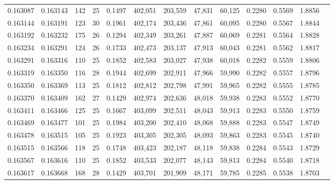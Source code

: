 \begin{tabular}{rrrrrrrrrrrrr}
0.163087 & 0.163143 & 142 &  25 &                                     0.1497 & 402,051 & 203,559 &  47,831 &  60,125 & 0.2280 & 0.5569 & 1.8856 \\
0.163144 & 0.163191 & 123 &  30 &                                     0.1961 & 402,174 & 203,436 &  47,861 &  60,095 & 0.2280 & 0.5567 & 1.8844 \\
0.163192 & 0.163232 & 175 &  26 &                                     0.1294 & 402,349 & 203,261 &  47,887 &  60,069 & 0.2281 & 0.5564 & 1.8828 \\
0.163234 & 0.163291 & 124 &  26 &                                     0.1733 & 402,473 & 203,137 &  47,913 &  60,043 & 0.2281 & 0.5562 & 1.8817 \\
0.163291 & 0.163316 & 110 &  25 &                                     0.1852 & 402,583 & 203,027 &  47,938 &  60,018 & 0.2282 & 0.5559 & 1.8806 \\
0.163319 & 0.163350 & 116 &  28 &                                     0.1944 & 402,699 & 202,911 &  47,966 &  59,990 & 0.2282 & 0.5557 & 1.8796 \\
0.163350 & 0.163369 & 113 &  25 &                                     0.1812 & 402,812 & 202,798 &  47,991 &  59,965 & 0.2282 & 0.5555 & 1.8785 \\
0.163370 & 0.163409 & 162 &  27 &                                     0.1429 & 402,974 & 202,636 &  48,018 &  59,938 & 0.2283 & 0.5552 & 1.8770 \\
0.163411 & 0.163466 & 125 &  25 &                                     0.1667 & 403,099 & 202,511 &  48,043 &  59,913 & 0.2283 & 0.5550 & 1.8759 \\
0.163469 & 0.163477 & 101 &  25 &                                     0.1984 & 403,200 & 202,410 &  48,068 &  59,888 & 0.2283 & 0.5547 & 1.8749 \\
0.163478 & 0.163515 & 105 &  25 &                                     0.1923 & 403,305 & 202,305 &  48,093 &  59,863 & 0.2283 & 0.5545 & 1.8740 \\
0.163515 & 0.163566 & 118 &  25 &                                     0.1748 & 403,423 & 202,187 &  48,118 &  59,838 & 0.2284 & 0.5543 & 1.8729 \\
0.163567 & 0.163616 & 110 &  25 &                                     0.1852 & 403,533 & 202,077 &  48,143 &  59,813 & 0.2284 & 0.5540 & 1.8718 \\
0.163617 & 0.163668 & 168 &  28 &                                     0.1429 & 403,701 & 201,909 &  48,171 &  59,785 & 0.2285 & 0.5538 & 1.8703 \\

\end{tabular}
